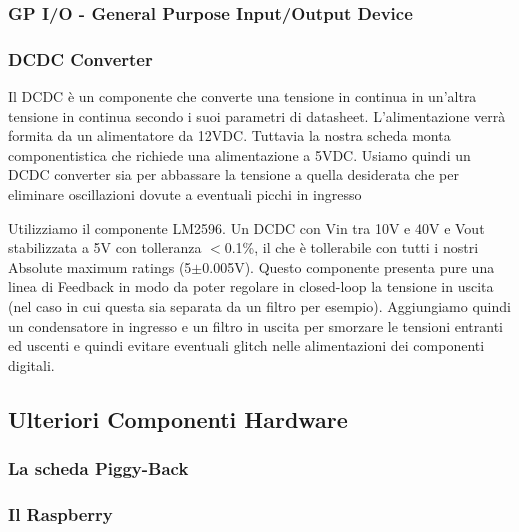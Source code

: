\documentclass[10pt]{article}
\begin{document}
		\subsubsection{GP I/O - General Purpose Input/Output Device}\label{sec:gpio}

		\subsubsection{DCDC Converter}\label{sec:dcdc}
		Il DCDC è un componente che converte una tensione in continua in un'altra tensione in continua secondo i suoi parametri di datasheet.
		L'alimentazione verrà formita da un alimentatore da 12VDC. Tuttavia la nostra scheda monta componentistica che richiede una alimentazione a 5VDC. Usiamo quindi un DCDC converter sia per abbassare la tensione a quella desiderata che per eliminare oscillazioni dovute a eventuali picchi in ingresso

		Utilizziamo il componente LM2596. Un DCDC con Vin tra 10V e 40V e Vout stabilizzata a 5V con tolleranza \(<\)0.1\%, il che è tollerabile con tutti i nostri Absolute maximum ratings (5\(\pm\)0.005V).
		Questo componente presenta pure una linea di Feedback in modo da poter regolare in closed-loop la tensione in uscita (nel caso in cui questa sia separata da un filtro per esempio).
		Aggiungiamo quindi un condensatore in ingresso e un filtro in uscita per smorzare le tensioni entranti ed uscenti e quindi evitare eventuali glitch nelle alimentazioni dei componenti digitali.

	\subsection{Ulteriori Componenti Hardware}
		\subsubsection{La scheda Piggy-Back}\label{sec:piggy}

		\subsubsection{Il Raspberry}\label{sec:rasp}
\end{document}
